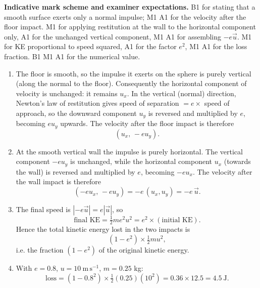 \documentclass[11pt]{article}
\begin{document}
\begin{corrige}
\textbf{Indicative mark scheme and examiner expectations.} B1 for stating that a smooth surface exerts only a normal impulse; M1 A1 for the velocity after the floor impact. M1 for applying restitution at the wall to the horizontal component only, A1 for the unchanged vertical component, M1 A1 for assembling $-e\vec{u}$. M1 for KE proportional to speed squared, A1 for the factor $e^{2}$, M1 A1 for the loss fraction. B1 M1 A1 for the numerical value.

\begin{enumerate}
\item The floor is smooth, so the impulse it exerts on the sphere is purely vertical (along the normal to the floor). Consequently the horizontal component of velocity is unchanged: it remains $u_{x}$. In the vertical (normal) direction, Newton's law of restitution gives speed of separation $=e\times$ speed of approach, so the downward component $u_{y}$ is reversed and multiplied by $e$, becoming $eu_{y}$ upwards. The velocity after the floor impact is therefore
\[ (u_{x},\,-eu_{y}). \]
\item At the smooth vertical wall the impulse is purely horizontal. The vertical component $-eu_{y}$ is unchanged, while the horizontal component $u_{x}$ (towards the wall) is reversed and multiplied by $e$, becoming $-eu_{x}$. The velocity after the wall impact is therefore
\[ (-eu_{x},\,-eu_{y})=-e\,(u_{x},u_{y})=-e\,\vec{u}. \]
\item The final speed is $|-e\vec{u}|=e|\vec{u}|$, so
\[ \text{final KE}=\tfrac12 m e^{2}u^{2}=e^{2}\times(\text{initial KE}). \]
Hence the total kinetic energy lost in the two impacts is
\[ (1-e^{2})\times\tfrac12 m u^{2}, \]
i.e. the fraction $(1-e^{2})$ of the original kinetic energy.
\item With $e=0.8$, $u=10\ \mathrm{m\,s^{-1}}$, $m=0.25$ kg:
\[ \text{loss}=(1-0.8^{2})\times\tfrac12(0.25)(10^{2})=0.36\times 12.5=4.5\ \mathrm{J}. \]
\end{enumerate}
\end{corrige}
\end{document}
